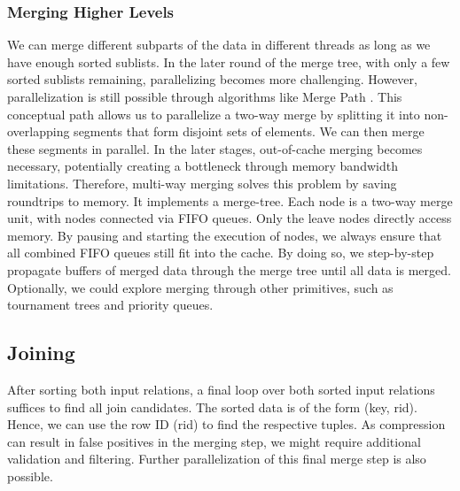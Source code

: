 \subsubsection{Merging Higher Levels}

We can merge different subparts of the data in different threads as long as we have enough
sorted sublists. In the later round of the merge tree, with only a few sorted sublists remaining,
parallelizing becomes more challenging. However, parallelization is still possible through
algorithms like Merge Path \cite{MergePath}. This conceptual path allows us to parallelize a two-way
merge by splitting it into non-overlapping segments that form disjoint sets of elements.
We can then merge these segments in parallel. In the later stages, out-of-cache merging becomes
necessary, potentially creating a bottleneck through memory bandwidth limitations. Therefore,
multi-way merging \cite{Balkesen,10.14778/1454159.1454171} solves this problem by saving roundtrips to memory. It implements a 
merge-tree. Each node is a two-way merge unit, with nodes connected via FIFO queues. 
Only the leave nodes directly access memory. By pausing and starting the execution of nodes,
we always ensure that all combined FIFO queues still fit into the cache. By doing so, we 
step-by-step propagate buffers of merged data through the merge tree until all data is merged.
Optionally, we could explore merging through other primitives, such as
tournament trees and priority queues.

\subsection{Joining}

After sorting both input relations, a final loop over both sorted input relations suffices to find all
join candidates. The sorted data is of the form (key, rid). Hence, we can use the row ID (rid) to
find the respective tuples. As compression can result in false positives in the merging step, we
might require additional validation and 
filtering. Further parallelization of this final merge step is also possible.

